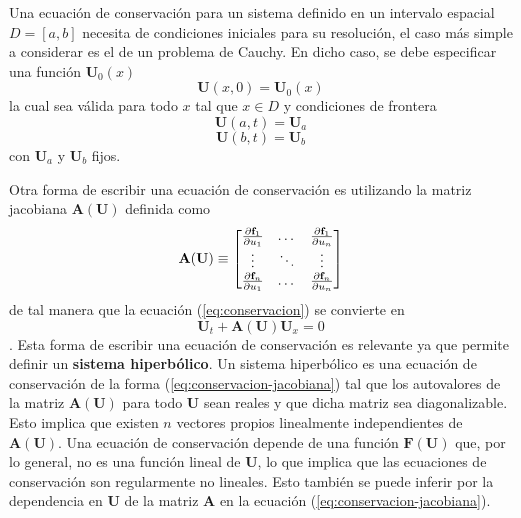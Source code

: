 Una ecuación de conservación para un sistema definido en un intervalo espacial $D = [a,b]$ necesita de condiciones iniciales para su resolución, el caso más simple a considerar es el de un problema de Cauchy. En dicho caso, se debe especificar una función $\mathbf{U}_0(x)$
\begin{equation}
	\mathbf{U}(x,0) = \mathbf{U}_0(x)
\end{equation} 
la cual sea válida para todo $x$ tal que $x \in D$ y condiciones de frontera
\begin{equation}
	\mathbf{U}(a,t) = \mathbf{U}_{a}
\end{equation}
\begin{equation}
	\mathbf{U}(b,t) = \mathbf{U}_{b}
\end{equation}
con $\mathbf{U}_{a}$ y $\mathbf{U}_{b}$ fijos.

Otra forma de escribir una ecuación de conservación es utilizando la matriz jacobiana $\mathbf{A(\mathbf{U})}$ definida como
\begin{equation}
	\mathbf{A(\mathbf{U})} \equiv
	\begin{bmatrix}
		\pdv{\mathbf{f}_1}{u_1} & \dots & \pdv{\mathbf{f}_1}{u_n} \\
		\vdots & \ddots & \vdots \\
		\pdv{\mathbf{f}_n}{u_1} & \dots & \pdv{\mathbf{f}_n}{u_n} \\
	\end{bmatrix}
\end{equation}
de tal manera que la ecuación (\ref{eq:conservacion}) se convierte en
\begin{equation}
	\mathbf{U}_{t} + \mathbf{A(\mathbf{U})}\mathbf{U}_{x} = 0
	\label{eq:conservacion-jacobiana}
\end{equation}.
Esta forma de escribir una ecuación de conservación es relevante ya que permite definir un \textbf{sistema hiperbólico}. Un sistema hiperbólico es una ecuación de conservación de la forma (\ref{eq:conservacion-jacobiana}) tal que los autovalores de la matriz $\mathbf{A(\mathbf{U})}$ para todo $\mathbf{U}$ sean reales y que dicha matriz sea diagonalizable. Esto implica que existen $n$ vectores propios linealmente independientes de $\mathbf{A(\mathbf{U})}$.
Una ecuación de conservación depende de una función $\mathbf{F(\mathbf{U})}$ que, por lo general, no es una función lineal de $\mathbf{U}$, lo que implica que las ecuaciones de conservación son regularmente no lineales. Esto también se puede inferir por la dependencia en $\mathbf{U}$ de la matriz $\mathbf{A}$ en la ecuación (\ref{eq:conservacion-jacobiana}).
